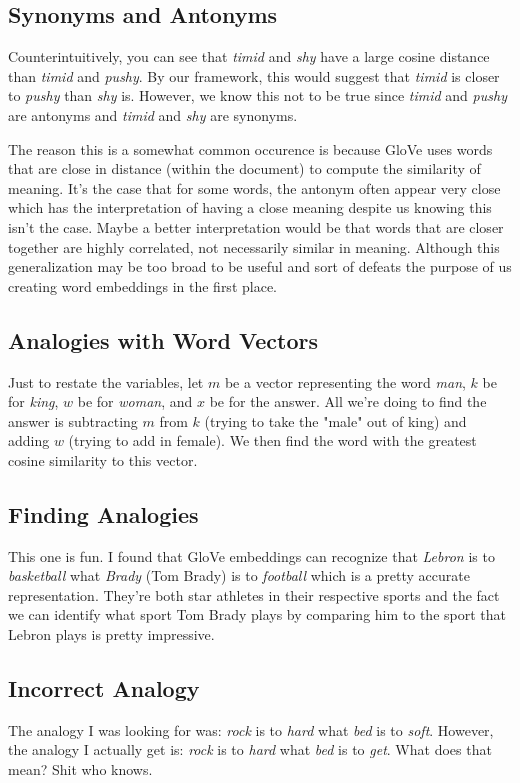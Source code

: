 \documentclass[12pt]{article}
\begin{document}
\subsection{Synonyms and Antonyms}
Counterintuitively, you can see that \emph{timid} and \emph{shy} have a large cosine distance than 
\emph{timid} and \emph{pushy}. By our framework, this would suggest that \emph{timid} is closer to 
\emph{pushy} than \emph{shy} is. However, we know this not to be true since \emph{timid} and \emph{pushy}
are antonyms and \emph{timid} and \emph{shy} are synonyms. 

The reason this is a somewhat common occurence is because GloVe uses words that are close in distance 
(within the document) to compute the similarity of meaning. It's the case that for some words, the antonym 
often appear very close which has the interpretation of having a close meaning despite us knowing this isn't
the case. Maybe a better interpretation would be that words that are closer together are highly correlated, 
not necessarily similar in meaning. Although this generalization may be too broad to be useful and 
sort of defeats the purpose of us creating word embeddings in the first place. 

\subsection{Analogies with Word Vectors}
Just to restate the variables, let $m$ be a vector representing the word \emph{man}, $k$ be for 
\emph{king}, $w$ be for \emph{woman}, and $x$ be for the answer. All we're doing to find the answer
is subtracting $m$ from $k$ (trying to take the "male" out of king) and adding $w$ (trying to add in 
female). We then find the word with the greatest cosine similarity to this vector. 

\subsection{Finding Analogies}
This one is fun. I found that GloVe embeddings can recognize that \emph{Lebron} is to \emph{basketball}
what \emph{Brady} (Tom Brady) is to \emph{football} which is a pretty accurate representation. They're 
both star athletes in their respective sports and the fact we can identify what sport Tom Brady plays 
by comparing him to the sport that Lebron plays is pretty impressive. 

\subsection{Incorrect Analogy}
The analogy I was looking for was: \emph{rock} is to \emph{hard} what \emph{bed} is to \emph{soft}. 
However, the analogy I actually get is: \emph{rock} is to \emph{hard} what \emph{bed} is to \emph{get}.
What does that mean? Shit who knows. 
\end{document}
